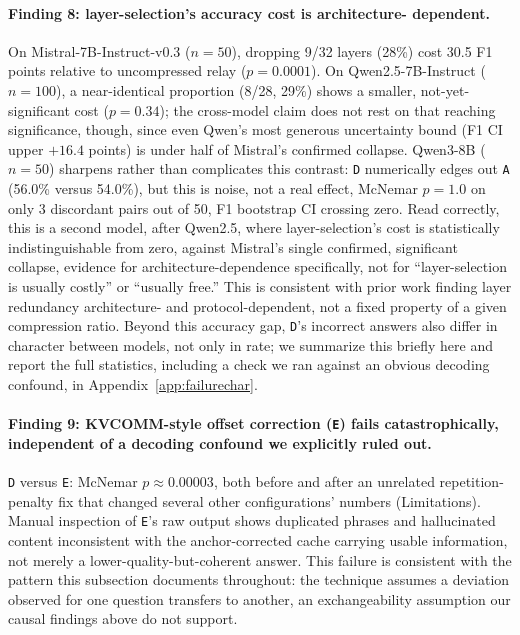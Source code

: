 \documentclass[11pt]{article}
\begin{document}
\paragraph{Finding 8: layer-selection's accuracy cost is architecture-
dependent.} On Mistral-7B-Instruct-v0.3 ($n=50$), dropping 9/32 layers
(28\%) cost 30.5 F1 points relative to uncompressed relay ($p=0.0001$).
On Qwen2.5-7B-Instruct ($n=100$), a near-identical proportion (8/28, 29\%)
shows a smaller, not-yet-significant cost ($p=0.34$); the cross-model
claim does not rest on that reaching significance, though, since even
Qwen's most generous uncertainty bound (F1 CI upper $+16.4$ points) is
under half of Mistral's confirmed collapse. Qwen3-8B ($n=50$) sharpens
rather than complicates this contrast: \texttt{D} numerically edges out
\texttt{A} (56.0\% versus 54.0\%), but this is noise, not a real effect,
McNemar $p=1.0$ on only 3 discordant pairs out of 50, F1 bootstrap CI
crossing zero. Read correctly, this is a second model, after Qwen2.5,
where layer-selection's cost is statistically indistinguishable from
zero, against Mistral's single confirmed, significant collapse, evidence
for architecture-dependence specifically, not for ``layer-selection is
usually costly'' or ``usually free.'' This is consistent with prior work
finding layer redundancy architecture- and protocol-dependent, not a
fixed property of a given compression ratio. Beyond this accuracy gap,
\texttt{D}'s incorrect answers also differ in character between models,
not only in rate; we summarize this briefly here and report the full
statistics, including a check we ran against an obvious decoding
confound, in Appendix~\ref{app:failurechar}.

\paragraph{Finding 9: KVCOMM-style offset correction (\texttt{E}) fails
catastrophically, independent of a decoding confound we explicitly ruled
out.} \texttt{D} versus \texttt{E}: McNemar $p\approx0.00003$, both
before and after an unrelated repetition-penalty fix that changed several
other configurations' numbers (Limitations). Manual inspection of
\texttt{E}'s raw output shows duplicated phrases and hallucinated content
inconsistent with the anchor-corrected cache carrying usable information,
not merely a lower-quality-but-coherent answer. This failure is
consistent with the pattern this subsection documents throughout: the
technique assumes a deviation observed for one question transfers to
another, an exchangeability assumption our causal findings above do not
support.
\end{document}
